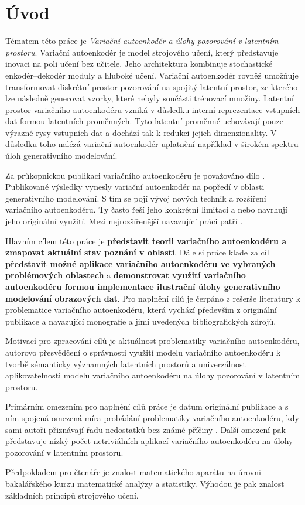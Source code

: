 \chapter*{Úvod}
Tématem této práce je \emph{Variační autoenkodér a úlohy pozorování v latentním prostoru}.
Variační autoenkodér je model strojového učení, který představuje inovaci na poli učení bez učitele.
Jeho architektura kombinuje stochastické enkodér–dekodér moduly a hluboké učení.
Variační autoenkodér rovněž umožňuje transformovat diskrétní prostor pozorování na spojitý latentní prostor, ze kterého lze následně generovat vzorky, které nebyly součásti trénovací množiny.
Latentní prostor variačního autoenkodéru vzniká v důsledku interní reprezentace vstupních dat formou latentních proměnných.
Tyto latentní proměnné uchovávají pouze výrazné rysy vstupních dat a dochází tak k redukci jejich dimenzionality.
V důsledku toho nalézá variační autoenkodér uplatnění například v širokém spektru úloh generativního modelování.

Za průkopnickou publikaci variačního autoenkodéru je považováno dílo \textcite{Kingma2014}.
Publikované výsledky vynesly variační autoenkodér na popředí v oblasti generativního modelování.
S tím se pojí vývoj nových technik a rozšíření variačního autoenkodéru.
Ty často řeší jeho konkrétní limitaci a nebo navrhují jeho originální využití.
Mezi nejrozšířenější navazující práci patří \textcite{Sohn2015}.

Hlavním cílem této práce je \textbf{představit teorii variačního autoenkodéru a zmapovat aktuální stav poznání v oblasti}.
Dále si práce klade za cíl \textbf{představit možné aplikace variačního autoenkodéru ve vybraných problémových oblastech} a \textbf{demonstrovat využití variačního autoenkodéru formou implementace ilustrační úlohy generativního modelování obrazových dat}.
Pro naplnění cílů je čerpáno z rešerše literatury k problematice variačního autoenkodéru, která vychází především z originální publikace \textcite{Kingma2014} a navazující monografie \textcite{Kingma2019} a jimi uvedených bibliografických zdrojů.

Motivací pro zpracování cílů je aktuálnost problematiky variačního autoenkodéru, autorovo přesvědčení o správnosti využití modelu variačního autoenkodéru k tvorbě sémanticky významných latentních prostorů a univerzálnost aplikovatelnosti modelu variačního autoenkodéru na úlohy pozorování v latentním prostoru.

Primárním omezením pro naplnění cílů práce je datum originální publikace a s ním spojená omezená míra probádání problematiky variačního autoenkodéru, kdy sami autoři přiznávají řadu nedostatků bez známé příčiny \cite{Kingma2019}.
Další omezení pak představuje nízký počet netriviálních aplikací variačního autoenkodéru na úlohy pozorování v latentním prostoru.

Předpokladem pro čtenáře je znalost matematického aparátu na úrovni bakalářského kurzu matematické analýzy a statistiky.
Výhodou je pak znalost základních principů strojového učení.